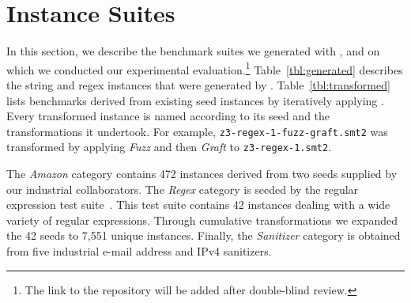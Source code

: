 \section{Instance Suites}
\label{sec:suites}

In this section, we describe the benchmark suites we generated
with \fuzzer{}, and on which we conducted our experimental
evaluation.\footnote{The link to the repository will be added after
double-blind review.} Table~\ref{tbl:generated} describes the string
and regex instances that were
generated by \generator{}. Table~\ref{tbl:transformed} lists benchmarks
derived from existing seed instances by iteratively applying \transformer{}.
Every transformed instance is named according to its
seed and the transformations it undertook. For example,
\texttt{z3-regex-1-fuzz-graft.smt2} was transformed by applying
\textit{Fuzz} and then \textit{Graft} to \texttt{z3-regex-1.smt2}.

The \textit{Amazon} category contains 472 instances derived from two seeds
supplied by our industrial collaborators. The \textit{Regex} category is
seeded by the \usOld{} regular expression test suite~\cite{z3str2-tests}. This
test suite contains 42 instances dealing with a wide variety of regular
expressions. Through cumulative transformations we expanded the 42 seeds to 7,551 unique
instances. Finally, the \textit{Sanitizer} category is obtained from
five industrial e-mail address and IPv4 sanitizers.

